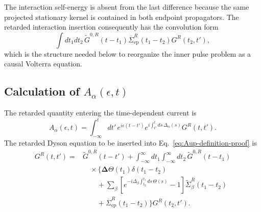 \documentclass[
 reprint,
 superscriptaddress,
 amsmath,amssymb,
 aps,prb,
 longbibliography,
 floatfix
]{revtex4-2}
\newcommand{\ep}{\mathrm{ep}}
\newcommand{\barSigma}{\overline{\Sigma}}
\begin{document}
The interaction self-energy is absent from the last difference because the same projected stationary kernel is contained in both endpoint propagators. The retarded interaction insertion consequently has the convolution form
\begin{equation*}
\int dt_1dt_2\,
\widetilde G^{0,R}(t-t_1)
\barSigma_{\ep}^{R}(t_1-t_2)
G^R(t_2,t'),
\end{equation*}
which is the structure needed below to reorganize the inner pulse problem as a causal Volterra equation.


\subsection{Calculation of $A_\alpha(\epsilon,t)$}
\label{sec:up-A}

The retarded quantity entering the time-dependent current is
\begin{equation}
A_\alpha(\epsilon,t)
=
\int_{-\infty}^{t}dt'\,
e^{i\epsilon(t-t')}
e^{i\int_{t'}^{t}ds\,\Delta_\alpha(s)}
G^R(t,t').
\label{eq:Aup-definition-proof}
\end{equation}
The retarded Dyson equation to be inserted into Eq.~\eqref{eq:Aup-definition-proof} is
\begin{equation}
\begin{aligned}
G^R(t,t')
={}&
\widetilde G^{0,R}(t-t')
+
\int_{-\infty}^{\infty}dt_1
\int_{-\infty}^{\infty}dt_2\,
\widetilde G^{0,R}(t-t_1)
\\
&\quad\times
\Bigg\{
\bm\Delta\Theta(t_1)\delta(t_1-t_2)
\\
&\qquad+
\sum_\beta
\left[
e^{-i\Delta_\beta
\int_{t_2}^{t_1}ds\,\Theta(s)}
-1
\right]
\widetilde\Sigma_\beta^R(t_1-t_2)
\\
&\qquad+
\barSigma_{\ep}^R(t_1-t_2)
\Bigg\}
G^R(t_2,t').
\end{aligned}
\label{eq:up-unreg-dyson-proof}
\end{equation}
\end{document}
